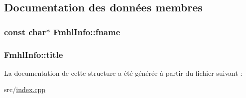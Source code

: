 \subsection{Documentation des données membres}
\hypertarget{struct_fmhl_info_af139ff6dcd5a3078dd119860da575ef5}{}
\subsubsection[{fname}]{\setlength{\rightskip}{0pt plus 5cm}const char$\ast$ Fmhl\+Info\+::fname}\label{struct_fmhl_info_af139ff6dcd5a3078dd119860da575ef5}
\hypertarget{struct_fmhl_info_afd88c71ff2562f6d67b07845e300f224}{}
\subsubsection[{title}]{ Fmhl\+Info\+::title}\label{struct_fmhl_info_afd88c71ff2562f6d67b07845e300f224}


La documentation de cette structure a été générée à partir du fichier suivant \+:\begin{DoxyCompactItemize}
\item 
src/\hyperlink{index_8cpp}{index.\+cpp}\end{DoxyCompactItemize}
